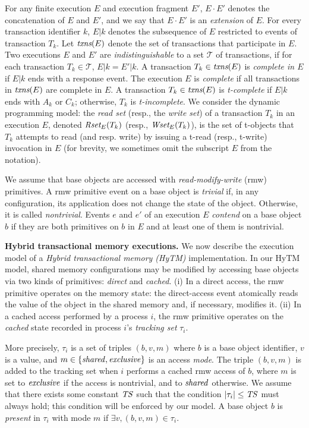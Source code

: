 For any finite execution $E$ and execution fragment $E'$, $E\cdot E'$ denotes the concatenation of $E$ and $E'$,
and we say that $E\cdot E'$ is an \emph{extension}
of $E$.
For every transaction identifier $k$,
$E|k$ denotes the subsequence of $E$ restricted to events of
transaction $T_k$.
Let $\textit{txns}(E)$ denote the set of transactions that participate in $E$.
Two executions $E$ and $E'$
are \emph{indistinguishable} to a set $\mathcal{T}$ of transactions, if
for each transaction $T_k \in \mathcal{T}$, $E|k=E'|k$.
A transaction $T_k\in \textit{txns}(E)$ is \emph{complete in $E$} if
$E|k$ ends with a response event.
The execution $E$ is \emph{complete} if all transactions in $\textit{txns}(E)$
are complete in $E$.
A transaction $T_k\in \textit{txns}(E)$ is \emph{t-complete} if $E|k$
ends with $A_k$ or $C_k$; otherwise, $T_k$ is \emph{t-incomplete}.
We consider the dynamic programming model: the \emph{read set} (resp., the \emph{write set}) of a transaction $T_k$ in an execution $E$,
denoted $\textit{Rset}_E(T_k)$ (resp., $\textit{Wset}_E(T_k)$), is the set of t-objects that $T_k$ attempts to read (and resp. write) 
by issuing a t-read (resp., t-write) invocation in $E$ (for brevity, we sometimes 
omit the subscript $E$ from the notation).

We assume that base objects are accessed with \emph{read-modify-write} (rmw) primitives. 
A rmw primitive event on a base object is \emph{trivial} if, in any configuration, its application
does not change the state of the object. 
Otherwise, it is called \emph{nontrivial}.
Events $e$ and $e'$ of an execution $E$  \emph{contend} on a base
object $b$ if they are both primitives on $b$ in $E$ and at least 
one of them is nontrivial.

\vspace{1mm}\noindent\textbf{Hybrid transactional memory executions.}
We now describe the execution model of a \emph{Hybrid transactional memory (HyTM)} implementation.
In our HyTM model, shared memory configurations may be modified by accessing base objects via two kinds of
primitives: \emph{direct} and \emph{cached}.
(i) In a direct access, the rmw primitive operates on the memory state:
the direct-access event atomically reads the value of the object in
the shared memory and, if necessary, modifies it.
(ii) In a cached access performed by a process $i$, the rmw primitive operates on the \emph{cached}
state recorded in process $i$'s \emph{tracking set} $\tau_i$. 

More precisely, $\tau_i$ is a set of triples $(b, v, m)$ where $b$ is a base object identifier, $v$ is a value, 
and $m \in \{\mathit{shared}, \mathit{exclusive}\}$ is an access \emph{mode}. 
The triple $(b, v, m)$ is added to the tracking set when $i$ performs a cached
rmw access of $b$, where $m$ is set to $\mathit{exclusive}$ if the access is
nontrivial, and to $\mathit{shared}$ otherwise.  
We assume that there exists some constant $\mathit{TS}$
such that the condition $|\tau_i| \leq \mathit{TS}$ must always hold; this
condition will be enforced by our model.
A base object $b$ is \emph{present} in $\tau_i$ with mode $m$ if $\exists v, (b,v,m) \in \tau_i$.

